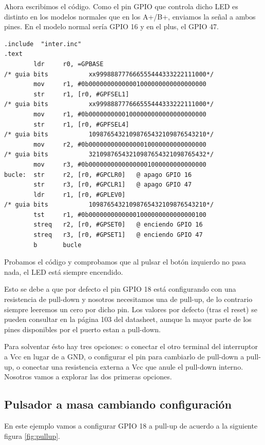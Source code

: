 Ahora escribimos el código. Como el pin GPIO que controla dicho LED es distinto en los
modelos normales que en los A+/B+, enviamos la señal a ambos pines. En el modelo normal
sería GPIO 16 y en el plus, el GPIO 47.

\newpage
\begin{lstlisting}[caption={apend1.s},label={lst:codigoApendice_1}]
        .include  "inter.inc"
.text
        ldr     r0, =GPBASE
/* guia bits           xx999888777666555444333222111000*/
        mov     r1, #0b00000000000001000000000000000000
        str     r1, [r0, #GPFSEL1]
/* guia bits           xx999888777666555444333222111000*/
        mov     r1, #0b00000000001000000000000000000000
        str     r1, [r0, #GPFSEL4]
/* guia bits           10987654321098765432109876543210*/
        mov     r2, #0b00000000000000010000000000000000
/* guia bits           32109876543210987654321098765432*/
        mov     r3, #0b00000000000000001000000000000000
bucle:  str     r2, [r0, #GPCLR0]   @ apago GPIO 16
        str     r3, [r0, #GPCLR1]   @ apago GPIO 47
        ldr     r1, [r0, #GPLEV0]
/* guia bits           10987654321098765432109876543210*/
        tst     r1, #0b00000000000001000000000000000100
        streq   r2, [r0, #GPSET0]   @ enciendo GPIO 16
        streq   r3, [r0, #GPSET1]   @ enciendo GPIO 47
        b       bucle
\end{lstlisting}

Probamos el código y comprobamos que al pulsar el botón izquierdo no pasa nada,
el LED está siempre encendido.

Esto se debe a que por defecto el pin GPIO 18 está configurando con una resistencia de
pull-down y nosotros necesitamos una de pull-up, de lo contrario siempre leeremos un cero
por dicho pin. Los valores por defecto (tras el reset) se pueden consultar en la página
103 del datasheet, aunque la mayor parte de los pines disponibles por el puerto estan
a pull-down.

Para solventar ésto hay tres opciones: o conectar el otro terminal del interruptor a Vcc en
lugar de a GND, o configurar el pin para cambiarlo de pull-down a pull-up, o conectar una
resistencia externa a Vcc que anule el pull-down interno. Nosotros vamos a explorar las dos
primeras opciones.

\subsection{Pulsador a masa cambiando configuración}

En este ejemplo vamos a configurar GPIO 18 a pull-up de acuerdo a la siguiente
figura \ref{fig:pullup}.

